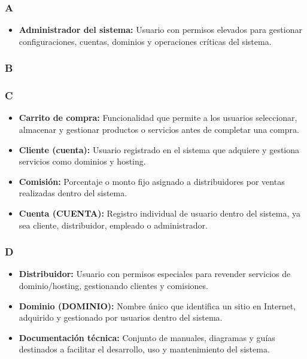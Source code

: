 \subsubsection*{A}
\begin{itemize}
    \item \textbf{Administrador del sistema:} Usuario con permisos elevados para gestionar configuraciones, cuentas, dominios y operaciones críticas del sistema.
\end{itemize}

\subsubsection*{B}

\subsubsection*{C}
\begin{itemize}
\item \textbf{Carrito de compra:} Funcionalidad que permite a los usuarios seleccionar, almacenar y gestionar productos o servicios antes de completar una compra.

\item \textbf{Cliente (cuenta):} Usuario registrado en el sistema que adquiere y gestiona servicios como dominios y hosting.

\item \textbf{Comisión:} Porcentaje o monto fijo asignado a distribuidores por ventas realizadas dentro del sistema.

\item \textbf{Cuenta (CUENTA):} Registro individual de usuario dentro del sistema, ya sea cliente, distribuidor, empleado o administrador.
\end{itemize}

\subsubsection*{D}
\begin{itemize}
    \item \textbf{Distribuidor:} Usuario con permisos especiales para revender servicios de dominio/hosting, gestionando clientes y comisiones.
    \item \textbf{Dominio (DOMINIO):} Nombre único que identifica un sitio en Internet, adquirido y gestionado por usuarios dentro del sistema.
    \item \textbf{Documentación técnica:} Conjunto de manuales, diagramas y guías destinados a facilitar el desarrollo, uso y mantenimiento del sistema.
\end{itemize}

